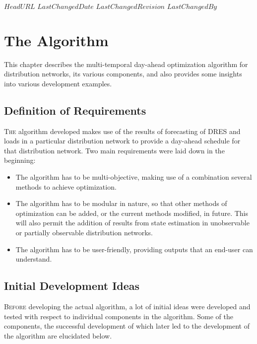 
\svnidlong
{$HeadURL$}
{$LastChangedDate$}
{$LastChangedRevision$}
{$LastChangedBy$}

\chapter{The Algorithm}

\begin{introduction}
This chapter describes the multi-temporal day-ahead optimization algorithm for distribution networks, its various components, and also provides some insights into various development examples.
\end{introduction}


\section{Definition of Requirements}

\lettrine[nindent=-0pt]{T}{he} algorithm developed makes use of the results of forecasting of DRES and loads in a particular distribution network to provide a day-ahead schedule for that distribution network. Two main requirements were laid down in the beginning:\\

\begin{itemize}
\item The algorithm has to be multi-objective, making use of a combination several methods to achieve optimization.\\
\item The algorithm has to be modular in nature, so that other methods of optimization can be added, or the current methods modified, in future. This will also permit the addition of results from state estimation in unobservable or partially observable distribution networks.\\
\item The algorithm has to be user-friendly, providing outputs that an end-user can understand.
\end{itemize}

\section{Initial Development Ideas}
\lettrine[nindent=0pt]{B}{efore} developing the actual algorithm, a lot of initial ideas were developed and tested with respect to individual components in the algorithm. Some of the components, the successful development of which later led to the development of the  algorithm are elucidated below.\\


